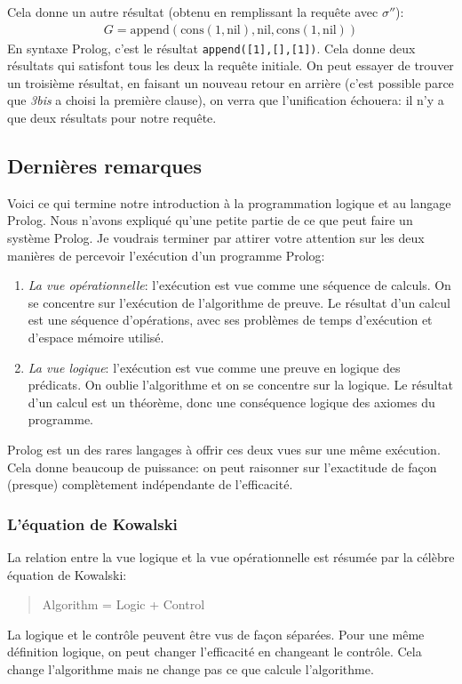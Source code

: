 Cela donne un autre résultat (obtenu en remplissant la requête avec $\sigma''$):
\begin{equation}
\begin{array}{l}
G = \mathrm{append}(\mathrm{cons}(1,\mathrm{nil}), \mathrm{nil}, \mathrm{cons}(1,\mathrm{nil}))
\end{array}
\end{equation}
En syntaxe Prolog, c'est le résultat \verb+append([1],[],[1])+.
Cela donne deux résultats qui satisfont tous les deux la requête initiale.
On peut essayer de trouver un troisième résultat, en faisant un nouveau retour en arrière
(c'est possible parce que {\em 3bis} a choisi la première clause),
on verra que l'unification échouera: il n'y a que deux résultats pour notre requête.

\subsection{Dernières remarques}

Voici ce qui termine notre introduction à la programmation logique et au langage Prolog.
Nous n'avons expliqué qu'une petite partie de ce que peut faire un système Prolog.
Je voudrais terminer par attirer votre attention sur les
deux manières de percevoir l'exécution d'un programme Prolog:
\begin{enumerate}
\item {\em La vue opérationnelle}: l'exécution est vue comme une séquence de calculs.
On se concentre sur l'exécution de l'algorithme de preuve.
Le résultat d'un calcul est une séquence d'opérations, avec ses problèmes de temps
d'exécution et d'espace mémoire utilisé.
\item {\em La vue logique}: l'exécution est vue comme une preuve en logique des prédicats.
On oublie l'algorithme et on se concentre sur la logique.
Le résultat d'un calcul est un théorème, donc une conséquence logique des axiomes du programme.
\end{enumerate}
Prolog est un des rares langages à offrir ces deux vues sur une même exécution.
Cela donne beaucoup de puissance: on peut raisonner sur l'exactitude de façon (presque) complètement
indépendante de l'efficacité.

\subsubsection{L'équation de Kowalski}

La relation entre la vue logique et la vue opérationnelle
est résumée par la célèbre équation de Kowalski:
\begin{quote}
Algorithm = Logic + Control
\end{quote}
La logique et le contrôle peuvent être vus de façon séparées.
Pour une même définition logique, on peut changer l'efficacité
en changeant le contrôle.
Cela change l'algorithme mais ne change pas ce que calcule l'algorithme.

